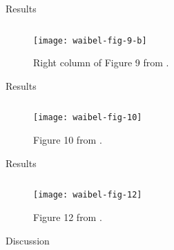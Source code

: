 \begin{frame}{Results}

\begin{figure}
\begin{columns}
\begin{column}{0.7\textwidth}
\texttt{[image: waibel-fig-9-b]}
\end{column}
\begin{column}{0.3\textwidth}
\caption{
Right column of Figure 9 from \cite{waibel2009genetic}.
}
\end{column}
\end{columns}
\end{figure}

\end{frame}

\begin{frame}{Results}


\begin{figure}
\begin{columns}
\begin{column}{0.7\textwidth}
\texttt{[image: waibel-fig-10]}
\end{column}
\begin{column}{0.3\textwidth}
\caption{
Figure 10 from \cite{waibel2009genetic}.
}
\end{column}
\end{columns}
\end{figure}

\end{frame}

\begin{frame}{Results}

\begin{figure}
\begin{columns}
\begin{column}{0.8\textwidth}
\texttt{[image: waibel-fig-12]}
\end{column}
\begin{column}{0.2\textwidth}
\caption{
Figure 12 from \cite{waibel2009genetic}.
}
\end{column}
\end{columns}
\end{figure}

\end{frame}

\begin{frame}{Discussion}


\end{frame}
